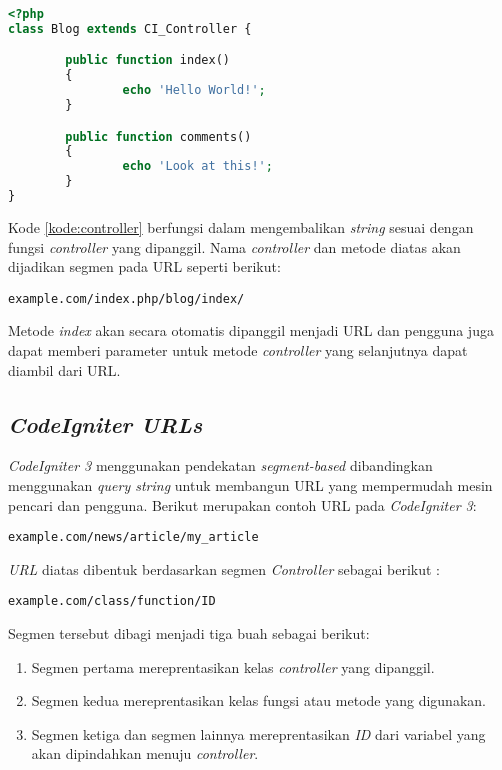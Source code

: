 \begin{lstlisting}[language=PHP, caption=Contoh \textit{controller} pada \textit{CodeIgniter 3}, label=kode:controller]
<?php
class Blog extends CI_Controller {

        public function index()
        {
                echo 'Hello World!';
        }

        public function comments()
        {
                echo 'Look at this!';
        }
}
\end{lstlisting}

Kode \ref{kode:controller} berfungsi dalam mengembalikan \textit{string} sesuai dengan fungsi \textit{controller} yang dipanggil. Nama \textit{controller} dan metode diatas akan dijadikan segmen pada URL seperti berikut:

\begin{center}
\verb|example.com/index.php/blog/index/|
\end{center}

Metode \textit{index} akan secara otomatis dipanggil menjadi URL dan pengguna juga dapat memberi parameter untuk metode \textit{controller} yang selanjutnya dapat diambil dari URL.

\subsection{\textit{CodeIgniter URLs}}

\textit{CodeIgniter 3} menggunakan pendekatan \textit{segment-based} dibandingkan menggunakan \textit{query string} untuk membangun URL yang mempermudah mesin pencari dan pengguna. Berikut merupakan contoh URL pada \textit{CodeIgniter 3}:

\begin{center}
\verb|example.com/news/article/my_article|
\end{center}

\textit{URL} diatas dibentuk berdasarkan segmen \textit{Controller} sebagai berikut :

\begin{center}
\verb|example.com/class/function/ID|
\end{center}

Segmen tersebut dibagi menjadi tiga buah sebagai berikut:
\begin{enumerate}
\item Segmen pertama mereprentasikan kelas \textit{controller} yang dipanggil.
\item Segmen kedua mereprentasikan kelas fungsi atau metode yang digunakan.
\item Segmen ketiga dan segmen lainnya mereprentasikan \textit{ID} dari variabel yang akan dipindahkan menuju \textit{controller}.
\end{enumerate}

